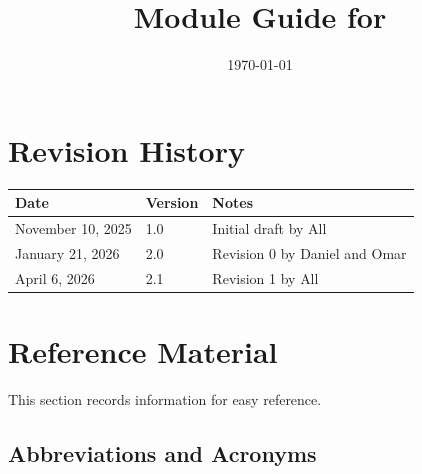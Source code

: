 \documentclass[12pt, titlepage]{article}
\begin{document}
\title{Module Guide for \progname{}} 
\author{\authname}
\date{\today}

\maketitle


\section{Revision History}

\begin{tabularx}{\textwidth}{p{3cm}p{2cm}X}
\toprule {\bf Date} & {\bf Version} & {\bf Notes}\\
\midrule
November 10, 2025 & 1.0 & Initial draft by All\\
January 21, 2026 & 2.0 & Revision 0 by Daniel and Omar\\
April 6, 2026 & 2.1 & Revision 1 by All\\
\bottomrule
\end{tabularx}

\newpage

\section{Reference Material}

This section records information for easy reference.

\subsection{Abbreviations and Acronyms}
\end{document}

